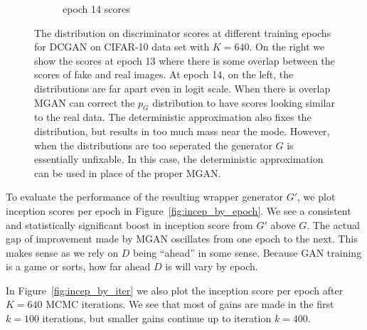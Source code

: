 \documentclass{article}
\newcommand{\PG}{{p_G}}
\begin{document}
\begin{figure}
\begin{subfigure}[b]{0.49\textwidth}
       \caption{epoch 14 scores}
       \label{fig:score_dist_no_overlap}
    \end{subfigure}
    \caption{{\small
    The distribution on discriminator scores at different training epochs for DCGAN on CIFAR-10 data set with $K=640$.
    On the right we show the scores at epoch 13 where there is some overlap between the scores of fake and real images.
    At epoch 14, on the left, the distributions are far apart even in logit scale.
    When there is overlap MGAN can correct the $\PG$ distribution to have scores looking similar to the real data.
    The deterministic approximation also fixes the distribution, but results in too much mass near the mode.
    However, when the distributions are too seperated the generator $G$ is essentially unfixable.
    In this case, the deterministic approximation can be used in place of the proper MGAN\@.
    }}
\end{figure}

To evaluate the performance of the resulting wrapper generator $G'$, we plot inception scores per epoch in Figure~\ref{fig:incep_by_epoch}.
We see a consistent and statistically significant boost in inception score from $G'$ above $G$.
The actual gap of improvement made by MGAN oscillates from one epoch to the next.
This makes sense as we rely on $D$ being ``ahead'' in some sense.
Because GAN training is a game or sorts, how far ahead $D$ is will vary by epoch.

In Figure~\ref{fig:incep_by_iter} we also plot the inception score per epoch after $K=640$ MCMC iterations.
We see that most of gains are made in the first $k=100$ iterations, but smaller gains continue up to iteration $k=400$.
\end{document}
